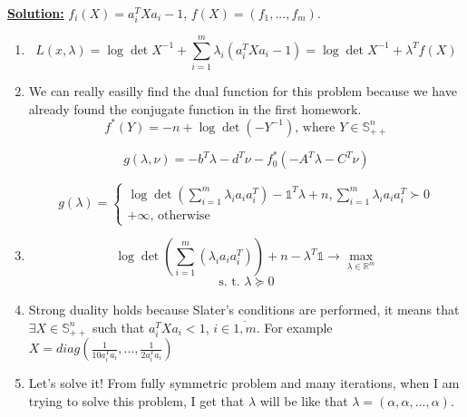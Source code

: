 \underline{\textbf{Solution:}}
$f_i(X) = a_i^TXa_i - 1$, $f(X) = (f_1, ..., f_m)$.
\begin{enumerate}
\item
\begin{equation*}
    L(x, \lambda) = \log \det X^{-1} + \sum\limits_{i=1}^m \lambda_i (a_i^TXa_i - 1)= \log \det X^{-1} + \lambda^T f(X)
\end{equation*}

\item  We can really easilly find the dual function for this problem because we have already found the conjugate function in the first homework.
\begin{equation*}
    f^*(Y) = -n + \log \det(-Y^{-1}) \text{, where } Y \in \mathds{S}_{++}^n
\end{equation*}

\begin{equation*}
    g(\lambda, \nu) = -b^T\lambda - d^T\nu - f_0^*(-A^T\lambda-C^T\nu)
\end{equation*}

\begin{equation*}
    g(\lambda) = \begin{cases}
     \log \det \left( \sum\limits_{i=1}^m \lambda_i a_ia_i^T \right) 
      - \mathds{1}^T \lambda + n, \sum\limits_{i=1}^m \lambda_i a_ia_i^T \succ 0 \\
      
     +\infty \text{, otherwise}
    \end{cases}
\end{equation*}


\item

\begin{equation*}
    \log \det \left(\sum\limits_{i=1}^m(\lambda_i a_ia_i^T) \right) + n - \lambda^T\mathds{1} \rightarrow \max_{\lambda \in \mathds{R}^m}
\end{equation*}
\begin{equation*}
    \text{s. t. } \lambda \succcurlyeq 0
\end{equation*}

\item Strong duality holds because Slater's conditions are performed, it means that $\exists X \in \mathds{S}_{++}^n$ such that $a_i^TXa_i < 1$, $i \in \overline{1, m}$. For example $X = diag(\frac{1}{10 a_i^Ta_i}, ..., \frac{1}{2a_i^Ta_i})$

\item Let's solve it! From fully symmetric problem and many iterations, when I am trying to solve this problem, I get that $\lambda $ will be like that $\lambda = (\alpha, \alpha, ..., \alpha)$.



\end{enumerate}
